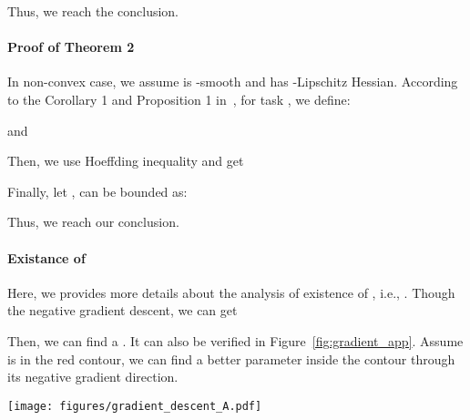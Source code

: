 \documentclass{article}
\begin{document}
Thus, we reach the conclusion.
\paragraph{Proof of Theorem 2}
In non-convex case, we assume  is -smooth and has -Lipschitz Hessian. According to the Corollary 1 and Proposition 1 in~\cite{kuzborskij2017data}, for task , we define:

and


Then, we use Hoeffding inequality and get

Finally, let ,  can be bounded as:

Thus, we reach our conclusion.
\paragraph{Existance of } Here, we provides more details about the analysis of existence of , i.e., . Though the negative gradient descent, we can get 

Then, we can find a . It can also be verified in Figure~\ref{fig:gradient_app}. Assume  is in the red contour, we can find a better parameter  inside the contour through its negative gradient direction. 
\begin{figure*}[!t]
    \centering
    \texttt{[image: figures/gradient\_descent\_A.pdf]}
    \caption{Illustration of Existance of .}
    \label{fig:gradient_app}
\end{figure*}
\end{document}
